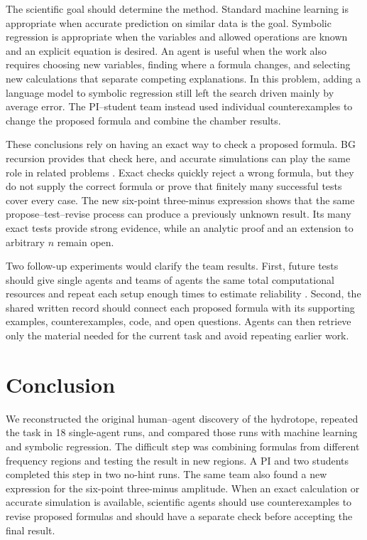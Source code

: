 \documentclass{article}
\begin{document}
The scientific goal should determine the method. Standard machine learning is
appropriate when accurate prediction on similar data is the goal. Symbolic
regression is appropriate when the variables and allowed operations are known
and an explicit equation is desired. An agent is useful when the work also
requires choosing new variables, finding where a formula changes, and selecting
new calculations that separate competing explanations. In this problem, adding
a language model to symbolic regression still left the search driven mainly by
average error. The PI--student team instead used individual counterexamples to
change the proposed formula and combine the chamber results.

These conclusions rely on having an exact way to check a proposed formula. BG
recursion provides that check here, and accurate simulations can play the same
role in related problems \citep{guevara2026singleminus,
Islam2026InterpretableSurrogates,Islam2026UnifiedRemnant,
Schwartz2026CParameter}. Exact checks quickly reject a wrong formula, but they
do not supply the correct formula or prove that finitely many successful tests
cover every case. The new six-point three-minus expression shows that the same
propose--test--revise process can produce a previously unknown result. Its many
exact tests provide strong evidence, while an analytic proof and an extension
to arbitrary $n$ remain open.

Two follow-up experiments would clarify the team results. First, future tests
should give single agents and teams of agents the same total computational
resources and repeat each setup enough times to estimate reliability
\citep{Guo2024MultiAgentSurvey,Chen2024ScienceAgentBench,
Lu2025AgentRewardBench}. Second, the shared written record should connect each
proposed formula with its supporting examples, counterexamples, code, and open
questions. Agents can then retrieve only the material needed for the current
task and avoid repeating earlier work.

\section{Conclusion}
\label{sec:conclusion}

We reconstructed the original human--agent discovery of the hydrotope,
repeated the task in 18 single-agent runs, and compared those runs with machine
learning and symbolic regression. The difficult step was combining formulas
from different frequency regions and testing the result in new regions. A
PI and two students completed this step in two no-hint runs. The same
team also found a new expression for the six-point three-minus amplitude. When
an exact calculation or accurate simulation is available, scientific agents
should use counterexamples to revise proposed formulas and should have a
separate check before accepting the final result.
\end{document}
